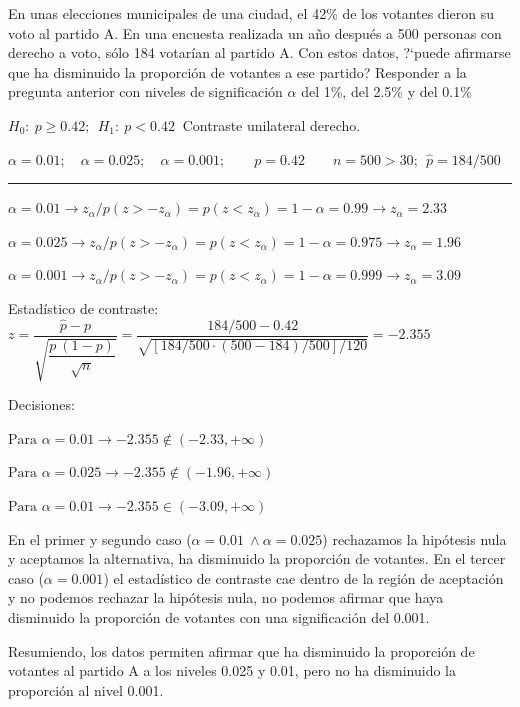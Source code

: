 \vspace{4mm}
\begin{ejemplo}
\begin{ejer}
	En unas elecciones municipales de una ciudad, el 42\% de los votantes dieron su voto al partido A. En una encuesta realizada un año después a 500 personas con derecho a voto, sólo 184 votarían al partido A. Con estos datos, ?`puede afirmarse que ha disminuido la proporción de votantes a ese partido? Responder a la pregunta anterior con niveles de significación $\alpha$ del 1\%, del 2.5\% y del 0.1\%
\end{ejer}
\end{ejemplo}

$H_0:\ p \ge 0.42;\ \ H_1:\ p < 0.42\ $ Contraste unilateral derecho.

$\alpha=0.01;\quad \alpha=0.025;\quad \alpha=0.001 ; \qquad p=0.42 \qquad n=500>30;\ \ \widehat p=184/500$

\rule{150pt}{0.1pt}

$\alpha=0.01 \to z_\alpha / p(z>-z_\alpha)=p(z<z_\alpha)=1-\alpha=0.99 \to z_\alpha=2.33$

$\alpha=0.025 \to z_\alpha / p(z>-z_\alpha)=p(z<z_\alpha)=1-\alpha=0.975 \to z_\alpha=1.96$

$\alpha=0.001 \to z_\alpha / p(z>-z_\alpha)=p(z<z_\alpha)=1-\alpha=0.999 \to z_\alpha=3.09$

Estadístico de contraste: $z=\dfrac{\widehat p -p}{\sqrt{\dfrac{p\ (1-p)}{\sqrt{n}}}}=\dfrac{184/500 - 0.42}{\sqrt{[184/500 \cdot (500-184)/500]/120}}=-2.355$

Decisiones:

$\text{Para } \alpha=0.01 \to -2.355 \notin (-2.33,+\infty)$

$\text{Para } \alpha=0.025 \to -2.355 \notin (-1.96,+\infty)$

$\text{Para } \alpha=0.01 \to -2.355 \in (-3.09,+\infty)$

En el primer y segundo caso ($\alpha=0.01 \ \wedge \alpha=0.025$) rechazamos la hipótesis nula y aceptamos la alternativa, ha disminuido la proporción de votantes. En el tercer caso ($\alpha=0.001$) el estadístico de contraste cae dentro de la región de aceptación y no podemos rechazar la hipótesis nula, no podemos afirmar que haya disminuido la proporción de votantes con una significación del 0.001.

Resumiendo, los datos permiten afirmar que ha disminuido la proporción de votantes al partido A a los niveles 0.025 y 0.01, pero no ha disminuido la proporción al nivel 0.001.

